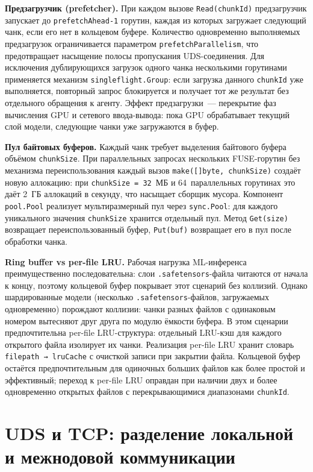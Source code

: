 \textbf{Предзагрузчик (prefetcher).} При каждом вызове \texttt{Read(chunkId)} предзагрузчик запускает до \texttt{prefetchAhead-1} горутин, каждая из которых загружает следующий чанк, если его нет в кольцевом буфере. Количество одновременно выполняемых предзагрузок ограничивается параметром \texttt{prefetchParallelism}, что предотвращает насыщение полосы пропускания UDS-соединения. Для исключения дублирующихся загрузок одного чанка несколькими горутинами применяется механизм \texttt{singleflight.Group}: если загрузка данного \texttt{chunkId} уже выполняется, повторный запрос блокируется и получает тот же результат без отдельного обращения к агенту. Эффект предзагрузки~--- перекрытие фаз вычисления GPU и сетевого ввода-вывода: пока GPU обрабатывает текущий слой модели, следующие чанки уже загружаются в буфер.

\textbf{Пул байтовых буферов.} Каждый чанк требует выделения байтового буфера объёмом \texttt{chunkSize}. При параллельных запросах нескольких FUSE-горутин без механизма переиспользования каждый вызов \texttt{make([]byte, chunkSize)} создаёт новую аллокацию: при \texttt{chunkSize = 32}~МБ и 64~параллельных горутинах это даёт 2~ГБ аллокаций в секунду, что насыщает сборщик мусора. Компонент \texttt{pool.Pool} реализует мультиразмерный пул через \texttt{sync.Pool}: для каждого уникального значения \texttt{chunkSize} хранится отдельный пул. Метод \texttt{Get(size)} возвращает переиспользованный буфер, \texttt{Put(buf)} возвращает его в пул после обработки чанка.

\textbf{Ring buffer vs per-file LRU.} Рабочая нагрузка ML-инференса преимущественно последовательна: слои \texttt{.safetensors}-файла читаются от начала к концу, поэтому кольцевой буфер покрывает этот сценарий без коллизий. Однако шардированные модели (несколько \texttt{.safetensors}-файлов, загружаемых одновременно) порождают коллизии: чанки разных файлов с одинаковым номером вытесняют друг друга по модулю ёмкости буфера. В этом сценарии предпочтительна per-file LRU-структура: отдельный LRU-кэш для каждого открытого файла изолирует их чанки. Реализация per-file LRU хранит словарь \texttt{filepath → lruCache} с очисткой записи при закрытии файла. Кольцевой буфер остаётся предпочтительным для одиночных больших файлов как более простой и эффективный; переход к per-file LRU оправдан при наличии двух и более одновременно открытых файлов с перекрывающимися диапазонами \texttt{chunkId}.

\section{UDS и TCP: разделение локальной и межнодовой коммуникации}

